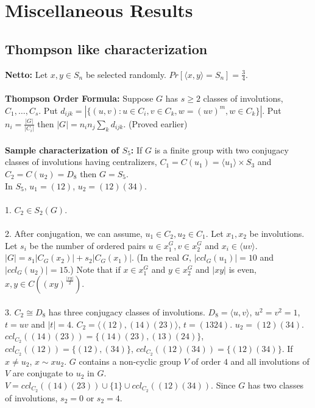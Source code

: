 \chapter{Miscellaneous Results}
\section{Thompson like characterization}
{\bf Netto:}  Let $x,y \in S_n$ be selected randomly.  
$Pr[ \langle x,y \rangle =S_n]= {\frac 3 4}$.  
\\
\\
{\bf Thompson Order Formula:} Suppose $G$ has $s\geq 2$ classes of involutions, $C_1, \ldots , C_s$.
Put $d_{ijk} = |\{ (u,v): u \in C_i, v \in C_k, w=(uv)^m, w \in C_k \}|$.  Put $n_i = {\frac {|G|} {|C_i|}}$ then
$|G| = n_i n_j \sum_k d_{ijk} $. (Proved earlier)
\\
\\
{\bf Sample characterization of $S_5$:}
If $G$ is a finite group with two conjugacy classes of involutions having
centralizers, $C_1= C(u_1) = \langle u_1 \rangle \times S_3$ and
$C_2= C(u_2) = D_8$ then $G = S_5$.
\\
In $S_5$, $u_1= (12)$, $u_2= (12)(34)$.
\\
\\
1. $C_2 \in S_2(G)$.
\\
\\
2.  After conjugation, we can assume, $u_1 \in C_2, u_2 \in C_1$.
Let $x_1, x_2$ be involutions.  Let $s_i$ be the number of ordered pairs
$u \in x_1^G, v \in x_2^G$ and $x_i \in \langle uv \rangle
$.  $|G|= s_1|C_G(x_2)| + s_2 |C_G(x_1)|$.
(In the real $G$, $|ccl_G(u_1)| = 10$ and $|ccl_G(u_2)|= 15$.)
Note that if 
$x \in x_1^G$ and $y \in x_2^G$ and $|xy|$ is even, $x,y \in C((xy)^{\frac {|xy|} 2})$.
\\
\\
3. 
$C_2 \cong D_8$ has three conjugacy classes of involutions.  
$D_8= \langle u, v \rangle $, $u^2=v^2=1$, $t= uv$ and $|t| = 4$.
$C_2= \langle (12),(14)(23) \rangle $, $t= (1324)$.
$u_2= (12)(34)$.
$ccl_{C_2}((14)(23))= \{ (14)(23), (13)(24) \}$,
$ccl_{C_2}((12))= \{ (12), (34) \}$,
$ccl_{C_2}((12)(34))= \{ (12)(34) \}$.  If $x \ne u_2$, $ x \sim x u_2$.
$G$ contains a non-cyclic group $V$ of order $4$
and all involutions of $V$ are conjugate to $u_2$ in $G$.
$V= ccl_{C_2}((14)(23)) \cup \{ 1 \} \cup ccl_{C_2}((12)(34))$.
Since $G$ has two classes of involutions, $s_2 = 0$ or $s_2 = 4$.
\\
\\
